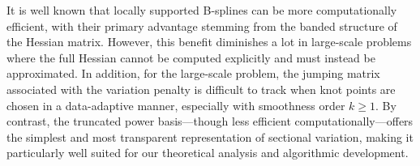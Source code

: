 \begin{remark}
\label{rem:comp_comparison}
It is well known that locally supported B-splines can be more computationally efficient, with their primary advantage stemming from the banded structure of the Hessian matrix. However, this benefit diminishes a lot in large-scale problems where the full Hessian cannot be computed explicitly and must instead be approximated. In addition, for the large-scale problem, the jumping matrix associated with the variation penalty is difficult to track when knot points are chosen in a data-adaptive manner, especially with smoothness order $k \geq 1$. By contrast, the truncated power basis—though less efficient computationally—offers the simplest and most transparent representation of sectional variation, making it particularly well suited for our theoretical analysis and algorithmic development.
\end{remark}